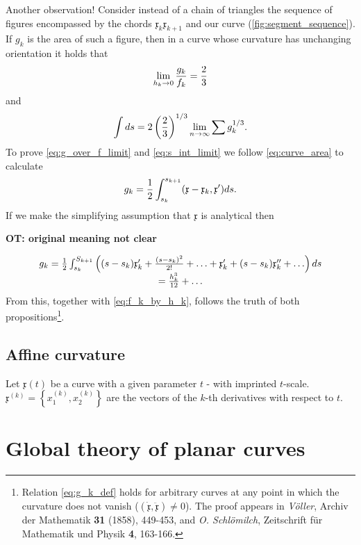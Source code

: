 \documentclass[11pt]{book} \usepackage{amssymb}
\newcommand{\myvec}[1]{\mathfrak{#1}}
\newcommand{\vecderiv}[1]{\dot{\myvec{#1}}}
\newcommand{\vecderivv}[1]{\ddot{\myvec{#1}}}
\begin{document}
Another observation! Consider instead of a chain of triangles the
sequence of figures encompassed by the chords $\myvec{x}_k\myvec{x}_{k+1}$ and
our curve (\ref{fig:segment_sequence}). If $g_k$ is the area of such a figure,
then in a curve whose curvature has unchanging orientation it holds that
\begin{equation}
  \label{eq:g_over_f_limit}
  \lim_{h_k\to 0}{g_k\over f_k}={2\over 3}
\end{equation}
and
\begin{equation}
  \label{eq:s_int_limit}
  \int ds=2\left({2\over 3}\right)^{1/3}\lim_{n\to\infty}\sum g_k^{1/3}.
\end{equation}
To prove \eqref{eq:g_over_f_limit} and \eqref{eq:s_int_limit} we follow
\eqref{eq:curve_area} to calculate
\begin{equation}
  \label{eq:g_k_def}
  g_k={1\over 2}\int_{s_k}^{s_{k+1}}(\myvec{x}-\myvec{x}_k,\myvec{x}')ds.
\end{equation}
 If we make the simplifying assumption that $\myvec{x}$ is analytical then
 
 {\bf OT: original meaning not clear}
 
 \begin{equation}
   \begin{array}{c}
     g_k={1\over 2}\int_{s_k}^{S_{k+1}}
     \left(
       (s-s_k)\myvec{x}_k'+{(s-s_k)^2\over 2!}+\ldots+\myvec{x}_k'+(s-s_k)\myvec{x}_k''+\ldots
     \right)ds
     \\
     ={h_k^3\over 12}+\ldots
   \end{array}
 \end{equation}
 From this, together with \eqref{eq:f_k_by_h_k}, follows the truth of
both propositions\footnote{Relation \eqref{eq:g_k_def} holds for arbitrary
curves at any point in which the curvature does not vanish 
($(\vecderiv{x},\vecderivv{x})\neq 0$). The proof appears in {\em V\"oller},
Archiv der Mathematik {\bf 31} (1858), 449-453, and {\em O. Schl\"omilch}, 
Zeitschrift f\"ur Mathematik und Physik {\bf 4}, 163-166.}.

\section{Affine curvature}
Let $\myvec{x}(t)$ be a curve with a given parameter $t$ - with imprinted 
$t$-scale. $\myvec{x}^{(k)}=\left\{x_1^{(k)},x_2^{(k)}\right\}$ are the vectors
of the $k$-th derivatives with respect to $t$.

\chapter{Global theory of planar curves}

 
\end{document}
